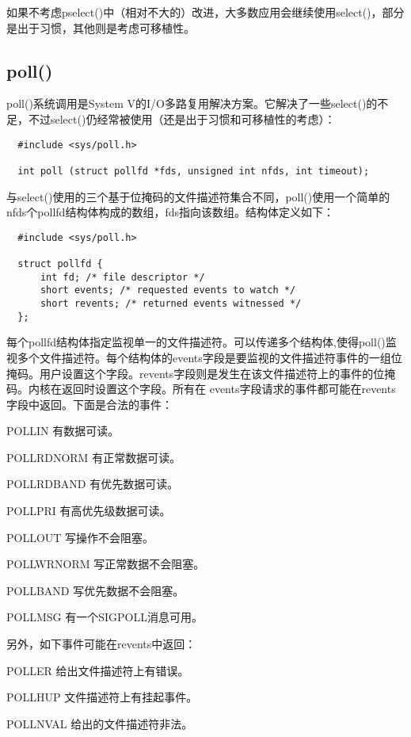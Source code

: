如果不考虑pselect()中（相对不大的）改进，大多数应用会继续使用select()，部分是出于习惯，其他则是考虑可移植性。

\subsection{poll()}

poll()系统调用是System V的I/O多路复用解决方案。它解决了一些select()的不足，不过select()仍经常被使用（还是出于习惯和可移植性的考虑）：

\begin{lstlisting}
  #include <sys/poll.h>

  int poll (struct pollfd *fds, unsigned int nfds, int timeout);
\end{lstlisting}

与select()使用的三个基于位掩码的文件描述符集合不同，poll()使用一个简单的nfds个pollfd结构体构成的数组，fds指向该数组。结构体定义如下：

\begin{lstlisting}
  #include <sys/poll.h>

  struct pollfd {
      int fd; /* file descriptor */
      short events; /* requested events to watch */
      short revents; /* returned events witnessed */
  };
\end{lstlisting}

每个pollfd结构体指定监视单一的文件描述符。可以传递多个结构体,使得poll()监视多个文件描述符。每个结构体的events字段是要监视的文件描述符事件的一组位掩码。用户设置这个字段。revents字段则是发生在该文件描述符上的事件的位掩码。内核在返回时设置这个字段。所有在 events字段请求的事件都可能在revents字段中返回。下面是合法的事件： 

\begin{eqlist*}
\item [POLLIN]
有数据可读。 
\item [POLLRDNORM]
有正常数据可读。
\item [POLLRDBAND]
有优先数据可读。
\item [POLLPRI]
有高优先级数据可读。
\item [POLLOUT]
写操作不会阻塞。
\item [POLLWRNORM]
写正常数据不会阻塞。
\item [POLLBAND]
写优先数据不会阻塞。
\item [POLLMSG]
有一个SIGPOLL消息可用。
\end{eqlist*}

另外，如下事件可能在revents中返回： 

\begin{eqlist*}
\item [POLLER]
给出文件描述符上有错误。
\item [POLLHUP]
文件描述符上有挂起事件。
\item [POLLNVAL]
给出的文件描述符非法。
\end{eqlist*}

